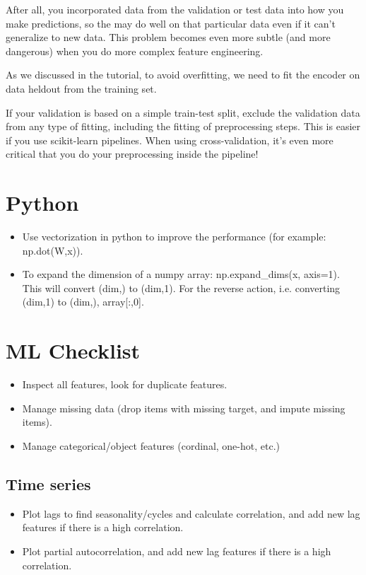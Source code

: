 \documentclass[12pt]{report}
\begin{document}
After all, you incorporated data from the validation or test data into how you make predictions, so the may do well on that particular data even if it can't generalize to new data. This problem becomes even more subtle (and more dangerous) when you do more complex feature engineering.

As we discussed in the tutorial, to avoid overfitting, we need to fit the encoder on data heldout from the training set.

If your validation is based on a simple train-test split, exclude the validation data from any type of fitting, including the fitting of preprocessing steps. This is easier if you use scikit-learn pipelines. When using cross-validation, it's even more critical that you do your preprocessing inside the pipeline!


\section{Python}
\begin{itemize}
\item Use vectorization in python to improve the performance (for example: np.dot(W,x)).
\item To expand the dimension of a numpy array: np.expand\_dims(x, axis=1). This will convert (dim,) to (dim,1). For the reverse action, i.e. converting (dim,1) to (dim,), array[:,0].
\end{itemize}



\section{ML Checklist}

\begin{itemize}
  \item Inspect all features, look for duplicate features.
  \item Manage missing data (drop items with missing target, and impute missing items).
  \item Manage categorical/object features (cordinal, one-hot, etc.)
\end{itemize}
\subsection{Time series}

\begin{itemize}
  \item Plot lags to find seasonality/cycles and calculate correlation, and add new lag features if there is a high correlation.
  \item Plot partial autocorrelation, and add new lag features if there is a high correlation.
\end{itemize}
\end{document}
